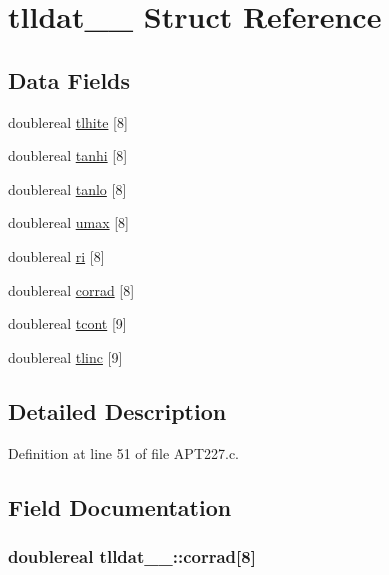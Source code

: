 \hypertarget{structtlldat__1__}{}\section{tlldat\+\_\+\_\+ Struct Reference}
\label{structtlldat__1__}
\subsection*{Data Fields}
\begin{DoxyCompactItemize}
\item 
doublereal \hyperlink{structtlldat__1___af8ae88a6e2749f071343c0bbd8d21312}{tlhite} \mbox{[}8\mbox{]}
\item 
doublereal \hyperlink{structtlldat__1___a0e3b0acf3a773a6acc876bbaf72fdbed}{tanhi} \mbox{[}8\mbox{]}
\item 
doublereal \hyperlink{structtlldat__1___a2681bffc310641d69c866dc6dcefebe3}{tanlo} \mbox{[}8\mbox{]}
\item 
doublereal \hyperlink{structtlldat__1___adfd9022cc343aa8a84e3db6e6ce228f5}{umax} \mbox{[}8\mbox{]}
\item 
doublereal \hyperlink{structtlldat__1___ace668e975926eb80188850f452e70bf5}{ri} \mbox{[}8\mbox{]}
\item 
doublereal \hyperlink{structtlldat__1___a756d0a5894c62fbced0fa3e9b0cd1c46}{corrad} \mbox{[}8\mbox{]}
\item 
doublereal \hyperlink{structtlldat__1___a16d8177c13c44f661703a270200c6f84}{tcont} \mbox{[}9\mbox{]}
\item 
doublereal \hyperlink{structtlldat__1___a29199fa8f0907c4736bf18679f9bab22}{tlinc} \mbox{[}9\mbox{]}
\end{DoxyCompactItemize}


\subsection{Detailed Description}


Definition at line 51 of file A\+P\+T227.\+c.



\subsection{Field Documentation}
\subsubsection[{\texorpdfstring{corrad}{corrad}}]{\setlength{\rightskip}{0pt plus 5cm}doublereal tlldat\+\_\+\_\+\+::corrad\mbox{[}8\mbox{]}}\hypertarget{structtlldat__1___a756d0a5894c62fbced0fa3e9b0cd1c46}{}\label{structtlldat__1___a756d0a5894c62fbced0fa3e9b0cd1c46}


